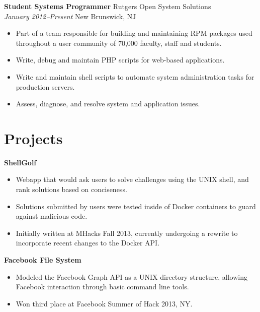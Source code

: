 \documentclass[centered,overlapped]{res}
\begin{document}
\begin{resume}
{\bf Student Systems Programmer} \hfill Rutgers Open System Solutions\\
\textit{January 2012--Present} \hfill New Brunswick, NJ
\begin{itemize} \itemsep -2pt %
	\item Part of a team responsible for building and maintaining RPM packages used throughout a user community of 70,000 faculty, staff and students.
	\item Write, debug and maintain PHP scripts for web-based applications.
	\item Write and maintain shell scripts to automate system administration tasks for production servers.
	\item Assess, diagnose, and resolve system and application issues.
\end{itemize}


\section{Projects}

	{\bf ShellGolf}
	\begin{itemize} \itemsep -2pt
        \item Webapp that would ask users to solve challenges using the UNIX
            shell, and rank solutions based on conciseness.
        \item Solutions submitted by users were tested inside of Docker
            containers to guard against malicious code.
        \item Initially written at MHacks Fall 2013, currently undergoing a
            rewrite to incorporate recent changes to the Docker API.
	\end{itemize}

	{\bf Facebook File System}
	\begin{itemize} \itemsep -2pt
		\item Modeled the Facebook Graph API as a UNIX directory structure,
            allowing Facebook interaction through basic command line tools.
        \item Won third place at Facebook Summer of Hack 2013, NY.
	\end{itemize}


\end{resume}
\end{document}
